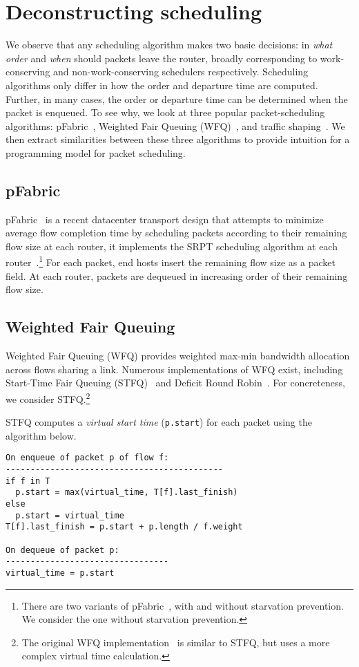 \section{Deconstructing scheduling}
\label{s:deconstruct}
We observe that any scheduling algorithm makes two basic decisions: in  {\em
what order} and {\em when} should packets leave the router, broadly corresponding
to work-conserving and non-work-conserving schedulers respectively.  Scheduling
algorithms only differ in how the order and departure time are computed.
Further, in many cases, the order or departure time can be determined when the
packet is enqueued.  To see why, we look at three popular packet-scheduling
algorithms: pFabric~\cite{pFabric}, Weighted Fair Queuing (WFQ)~\cite{wfq}, and
traffic shaping~\cite{tbf}. We then extract similarities between these three
algorithms to provide intuition for a programming model for packet scheduling.

\subsection{pFabric}
pFabric~\cite{pFabric} is a recent datacenter transport design that attempts to
minimize average flow completion time by scheduling packets according to their
remaining flow size at each router, \ie it implements the SRPT scheduling
algorithm at each router~\cite{srpt}.\footnote{There are two variants of
pFabric~\cite{pFabric}, with and without starvation prevention.  We consider
the one without starvation prevention.} For each packet, end hosts insert the
remaining flow size as a packet field. At each router, packets are dequeued in
increasing order of their remaining flow size.

\subsection{Weighted Fair Queuing}
\label{ss:decon_wfq}
Weighted Fair Queuing (WFQ) provides weighted max-min bandwidth allocation
across flows sharing a link. Numerous implementations of WFQ exist, including
Start-Time Fair Queuing (STFQ)~\cite{stfq} and Deficit Round Robin~\cite{drr}.
For concreteness, we consider STFQ.\footnote{The original WFQ
implementation~\cite{wfq} is similar to STFQ, but uses a more complex virtual
time calculation.}

STFQ computes a {\em virtual start time} ({\tt p.start}) for each packet using
the algorithm below. 
\begin{lstlisting}[style=customc]
On enqueue of packet p of flow f:
--------------------------------------------
if f in T
  p.start = max(virtual_time, T[f].last_finish)
else
  p.start = virtual_time
T[f].last_finish = p.start + p.length / f.weight

On dequeue of packet p:
---------------------------------
virtual_time = p.start
\end{lstlisting}

